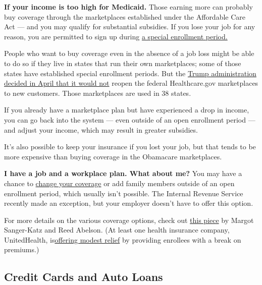 \textbf{If your income is too high for Medicaid.} Those earning more can
probably buy coverage through the marketplaces established under the
Affordable Care Act --- and you may qualify for substantial subsidies.
If you lose your job for any reason, you are permitted to sign up during
\href{https://www.healthcare.gov/have-job-based-coverage/if-you-lose-job-based-coverage/}{a
special enrollment period.}

People who want to buy coverage even in the absence of a job loss might
be able to do so if they live in states that run their own marketplaces;
some of those states have established special enrollment periods. But
the
\href{https://www.nytimes.com/2020/04/01/upshot/obamacare-markets-coronavirus-trump.html}{Trump
administration decided in April that it would not} reopen the federal
Healthcare.gov marketplaces to new customers. Those marketplaces are
used in 38 states.

If you already have a marketplace plan but have experienced a drop in
income, you can go back into the system --- even outside of an open
enrollment period --- and adjust your income, which may result in
greater subsidies.

It's also possible to keep your insurance if you lost your job, but that
tends to be more expensive than buying coverage in the Obamacare
marketplaces.

\textbf{I have a job and a workplace plan. What about me?} You may have
a chance to
\href{https://www.nytimes.com/2020/05/12/business/employer-health-plans-coronavirus.html}{change
your coverage} or add family members outside of an open enrollment
period, which usually isn't possible. The Internal Revenue Service
recently made an exception, but your employer doesn't have to offer this
option.

For more details on the various coverage options, check out
\href{https://www.nytimes.com/2020/03/25/upshot/coronavirus-health-insurance-faq.html}{this
piece} by Margot Sanger-Katz and Reed Abelson. (At least one health
insurance company, UnitedHealth,
is\href{https://www.nytimes.com/2020/05/07/health/unitedhealth-coronavirus.html}{offering
modest relief} by providing enrollees with a break on premiums.)

\hypertarget{credit-cards-and-auto-loans}{%
\subsection{Credit Cards and Auto
Loans}\label{credit-cards-and-auto-loans}}

